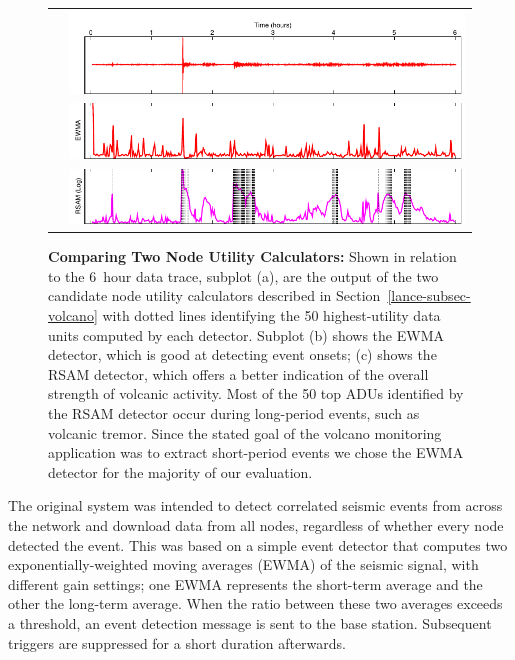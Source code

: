 \begin{figure}[t]
\begin{center}
\begin{tabular}{ll}
\raisebox{0.35in}{\parbox{0.05in}{\textbf{(a)}}} & 
\includegraphics[width=0.95\hsize]{./figs/used/sixhour.pdf}
\vspace{-0.05in}\\
\raisebox{0.31in}{\parbox{0.05in}{\textbf{(b)}}} & 
\includegraphics[width=0.95\hsize]{./figs/used/ewma.pdf}
\vspace{-0.05in}\\
\raisebox{0.32in}{\parbox{0.05in}{\textbf{(c)}}} & 
\includegraphics[width=0.95\hsize]{./figs/used/rsam.pdf}
\end{tabular}
\end{center}

\caption{\textbf{Comparing Two Node Utility Calculators:} Shown in relation
to the 6~hour data trace, subplot (a), are the output of the two candidate
node utility calculators described in Section~\ref{lance-subsec-volcano}
with dotted lines identifying the 50 highest-utility data units computed by
each detector. Subplot (b) shows the EWMA detector, which is good at
detecting event onsets; (c) shows the RSAM detector, which offers a better
indication of the overall strength of volcanic activity. Most of the 50 top
ADUs identified by the RSAM detector occur during long-period events, such as
volcanic tremor. Since the stated goal of the volcano monitoring application
was to extract short-period events we chose the EWMA detector for the
majority of our evaluation.}

\label{lance-fig-nucplot}
\end{figure}

The original system was intended to detect correlated seismic events from
across the network and download data from all nodes, regardless of whether
every node detected the event. This was based on a simple event detector that
computes two exponentially-weighted moving averages (EWMA) of the seismic
signal, with different gain settings; one EWMA represents the short-term
average and the other the long-term average. When the ratio between these two
averages exceeds a threshold, an event detection message is sent to the base
station. Subsequent triggers are suppressed for a short duration afterwards.

